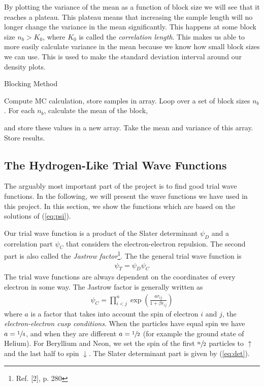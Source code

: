 \documentclass[twocolumns, a4paper,10pt,fleqn]{extarticle}
\newcommand{\eq}[1]{{\small\begin{align*}#1\end{align*}}}
\newcommand{\equ}[1]{{\small\begin{align}#1\end{align}}}
\begin{document}
By plotting the variance of the mean as a function of block size we 
will see that it reaches a plateau.
This plateau means that increasing the sample length will no longer
change the variance in the mean significantly. 
This happens at some block size $n_b > K_0$, 
where $K_0$ is called the \textit{correlation length}. 
This makes us able to more easily calculate variance in the mean because we know how small block sizes we can use. 
This is used to make the standard deviation interval around our density plots. 

\begin{algorithm}[H]
	\caption{Blocking Method}\label{algo:block}
  \begin{algorithmic}[1]
      \State Compute MC calculation, store samples in array.
      \State Loop over a set of block sizes $n_b$.
      \State For each $n_b$, calculate the mean of the block,
      
        and store these values in a new array.
      \State Take the mean and variance of this array.
      \State Store results.
    \EndProcedure
  \end{algorithmic}
\end{algorithm}

\subsection{The Hydrogen-Like Trial Wave Functions}
The arguably most important part of the project is to find good
trial wave functions. In the following, we will present
the wave functions we have used in this project.
In this section, we show the functions which are based on
the solutions of (\ref{eq:psi}).

Our trial wave function is a product of the Slater determinant $\psi_D$ and
a correlation part $\psi_C$ that considers the electron-electron repulsion.
The second part is also called the \textit{Jastrow factor}\footnote{Ref. [2], p. 280}.
The the general trial wave function is
\eq{
  \psi_T = \psi_D \psi_C
}
The trial wave functions are always dependent on the coordinates of every
electron in some way.
The Jastrow factor is generally written as
\equ{
  \psi_C = \prod_{i<j}^{n}\exp{\left(\frac{a r_{ij}}{1+\beta r_{ij}}\right)}
  \label{eq:psicor}
}
where $a$ is a factor that takes into account the spin of electron $i$ and $j$,
the \textit{electron-electron cusp conditions}.
When the particles have equal spin we have $a=\sfrac{1}{4}$,
and when they are different $a=\sfrac{1}{2}$ (for example the ground state of Helium).
For Beryllium and Neon, we set the spin of the first $\sfrac{n}{2}$ particles to
$\uparrow$ and the last half to spin $\downarrow$.
The Slater determinant part is given by (\ref{eq:det}).
\end{document}
